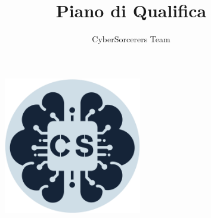 \documentclass{article}
\title{\Huge{\textbf{Piano di Qualifica}}\vspace{-1em}}
\author{CyberSorcerers Team}
\date{}
\begin{document}
\maketitle
\vspace{-3em}
\begin{figure}[h]
  \centering
  \includegraphics[width=6cm, height=6cm]{documenti/logo rotondo.png}
  \label{fig:immagine}
\end{figure}
\end{document}
